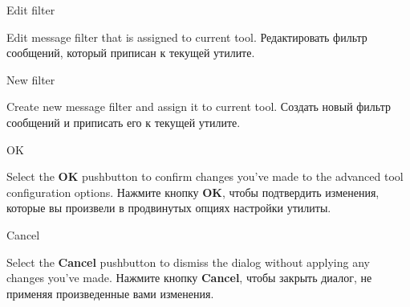 \begin{popup}
\caption{Edit filter}

\ifenglish
Edit message filter that is assigned to current tool.
 \else
Редактировать фильтр сообщений, который приписан к текущей утилите.
 \fi
\end{popup}

\begin{popup}
\caption{New filter}

\ifenglish
Create new message filter and assign it to current tool.
 \else
Создать новый фильтр сообщений и приписать его к текущей утилите.
 \fi
\end{popup}

\begin{popup}
\caption{OK}

\ifenglish
Select the {\bf OK} pushbutton to confirm changes you've made to the
advanced tool configuration options.
 \else
Нажмите кнопку {\bf OK}, чтобы подтвердить изменения, которые вы произвели 
в продвинутых опциях настройки утилиты. 
 \fi
\end{popup}

\begin{popup}
\caption{Cancel}

\ifenglish
Select the {\bf Cancel} pushbutton to dismiss the dialog without
applying any changes you've made.
 \else
Нажмите кнопку {\bf Cancel}, чтобы закрыть диалог, не применяя произведенные
вами изменения.
 \fi
\end{popup}

